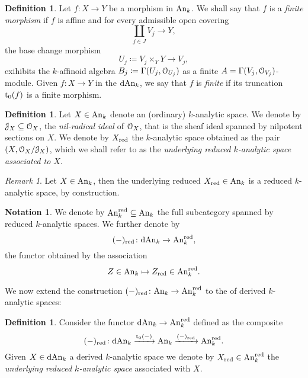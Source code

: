 \documentclass[10pt,a4paper,reqno]{amsart} %
\theoremstyle{plain}
\theoremstyle{definition}
\newtheorem{defin}[thm]{Definition}
\newtheorem{notation}[thm]{Notation}
\theoremstyle{remark}
\newtheorem{rem}[thm]{Remark}
\numberwithin{equation}{section}
\begin{document}
\begin{defin}
    Let $f \colon X \to Y$ be a morphism in $\mathrm{An}_k$. We shall say that $f$ is a \emph{finite morphism} if $f$ is affine and for every admissible open covering
        \[
            \coprod_{j \in J} V_j \to Y,  
        \]
    the base change morphism
        \[
            U_j \coloneqq V_j \times_Y Y \to V_j,  
        \]
    exihibits the $k$-affinoid algebra $B_j \coloneqq \Gamma(U_j, \mathcal O_{U_j})$ as a finite $A = \Gamma(V_j, \mathcal O_{V_j})$-module.
    Given $f \colon X \to Y$ in the \infcat $\mathrm{dAn}_k$, we say that $f$ is \emph{finite} if its truncation $\mathrm{t}_0(f)$ is a finite
    morphism.
\end{defin}


\begin{defin} Let $X \in \mathrm{An}_k$ denote an (ordinary) $k$-analytic space.
    We denote by $\mathcal J_X \subseteq \mathcal O_X$, the \emph{nil-radical ideal} of $\mathcal O_X$, that is the sheaf ideal spanned by nilpotent
    sections on $X$. We denote by $X_{\mathrm{red}}$ the $k$-analytic space obtained as the pair $(X, \mathcal O_{X}/ \mathcal J_X)$, which we shall refer to as the \emph{underlying reduced $k$-analytic space
    associated to $X$}.       
\end{defin}

\begin{rem}
    Let $X \in \mathrm{An}_k$, then the underlying reduced $X_{\mathrm{red}} \in \mathrm{An}_k$ is a reduced $k$-analytic space, by construction.
\end{rem}

\begin{notation}
    We denote by $\mathrm{An}_k^\mathrm{red} \subseteq \mathrm{An}_k$ the full subcategory spanned by reduced $k$-analytic spaces. We further denote by
    \[(-)_{\mathrm{red}} \colon \mathrm{dAn}_k \to \mathrm{An}_k^{\mathrm{red}},\]
    the functor obtained by the association
        \[
            Z \in \mathrm{An}_k \mapsto Z_{\mathrm{red}} \in \mathrm{An}_k^\mathrm{red}.
        \]
\end{notation}

We now extend the construction $(-)_{\mathrm{red}} \colon \mathrm{An}_k \to \mathrm{An}_k^\mathrm{red}$ to the \infcat of derived $k$-analytic spaces:

\begin{defin}
    Consider the functor $\mathrm{dAn}_k \to \mathrm{An}_k^\mathrm{red}$ defined as the composite
        \[
            (-)_{\mathrm{red}} \colon \mathrm{dAn}_k \xrightarrow{\mathrm{t}_0(-)} \mathrm{An}_k \xrightarrow{(-)_{\mathrm{red}}} \mathrm{An}_k^\mathrm{red}.
        \]
    Given $X \in \mathrm{dAn}_k$ a derived $k$-analytic space we denote by $X_{\mathrm{red}} \in \mathrm{An}_k^{\mathrm{red}}$ the \emph{underlying reduced $k$-analytic space}
    associated with $X$. 
\end{defin}
\end{document}
